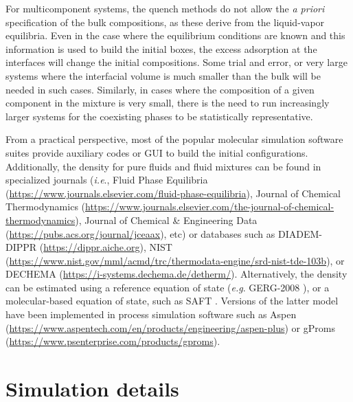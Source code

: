 \documentclass[9pt,bestpractices]{livecoms}
\begin{document}
For multicomponent systems, the quench methods do not allow the \textit{a
priori} specification of the bulk compositions, as these derive from the
liquid-vapor equilibria. Even in the case where the equilibrium conditions are
known and this information is used to build the initial boxes, the excess
adsorption at the interfaces will change the initial compositions. Some trial
and error, or very large systems where the interfacial volume is much smaller
than the bulk will be needed in such cases. Similarly, in cases where the
composition of a given component in the mixture is very small, there is the
need to run increasingly larger systems for the coexisting phases to be
statistically representative.

From a practical perspective, most of the popular molecular simulation software
suites provide auxiliary codes or GUI to build the initial configurations.
Additionally, the density for pure fluids and fluid mixtures can be found in
specialized journals (\textit{i.e}., Fluid Phase Equilibria (\url{https://www.journals.elsevier.com/fluid-phase-equilibria}),
Journal of Chemical Thermodynamics (\url{https://www.journals.elsevier.com/the-journal-of-chemical-thermodynamics}),
Journal of Chemical \& Engineering Data (\url{https://pubs.acs.org/journal/jceaax}),
etc)
or databases such as DIADEM-DIPPR (\url{https://dippr.aiche.org}),
NIST \citep{lemmon2013} (\url{https://www.nist.gov/mml/acmd/trc/thermodata-engine/srd-nist-tde-103b}),
or DECHEMA (\url{https://i-systems.dechema.de/detherm/}).
Alternatively, the density can be estimated using a reference equation of state
(\textit{e.g}. GERG-2008 \citep{kunz2012}),
or a molecular-based equation of
state, such as SAFT \citep{lafitte2013}.
Versions of the latter model have been implemented in process simulation
software such as Aspen (\url{https://www.aspentech.com/en/products/engineering/aspen-plus})
or gProms (\url{https://www.psenterprise.com/products/gproms}).

\section{Simulation details}
\end{document}
